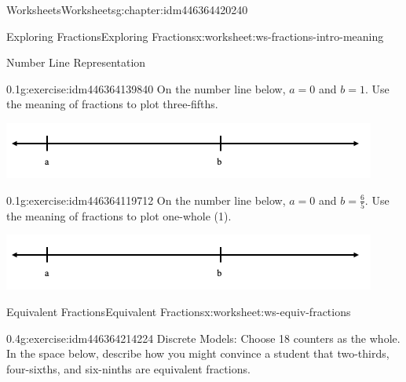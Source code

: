 \documentclass[twoside,11pt,]{book}
\begin{document}
\begin{chapterptx}{Worksheets}{}{Worksheets}{}{}{g:chapter:idm446364420240}
\begin{worksheet-section-numberless}{Exploring Fractions}{}{Exploring Fractions}{}{}{x:worksheet:ws-fractions-intro-meaning}
\begin{introduction}{}
Number Line Representation%
\end{introduction}%
\begin{divisionexercise}{9}{}{0.1}{g:exercise:idm446364139840}%
On the number line below, \(a= 0 \) and \(b=1 \).  Use the meaning of fractions to plot three-fifths.%
\begin{sidebyside}{1}{0}{0}{0}%
\begin{sbspanel}{1}%
\includegraphics[width=1\linewidth]{images/fractions-number-line.png}
\end{sbspanel}%
\end{sidebyside}%
\end{divisionexercise}%
\clearpage
\begin{divisionexercise}{10}{}{0.1}{g:exercise:idm446364119712}%
On the number line below, \(a= 0 \) and \(b=\frac{6}{5} \).  Use the meaning of fractions to plot one-whole (1).%
\begin{sidebyside}{1}{0}{0}{0}%
\begin{sbspanel}{1}%
\includegraphics[width=1\linewidth]{images/fractions-number-line.png}
\end{sbspanel}%
\end{sidebyside}%
\end{divisionexercise}%
\end{worksheet-section-numberless}
\restoregeometry
%
%
\typeout{************************************************}
\typeout{************************************************}
%
\begin{worksheet-section-numberless}{Equivalent Fractions}{}{Equivalent Fractions}{}{}{x:worksheet:ws-equiv-fractions}
\begin{divisionexercise}{1}{}{0.4}{g:exercise:idm446364214224}%
Discrete Models: Choose 18 counters as the whole. In the space below, describe how you might convince a student that two-thirds, four-sixths, and six-ninths are equivalent fractions.%
\end{divisionexercise}%

\end{worksheet-section-numberless}
\end{chapterptx}
\end{document}
